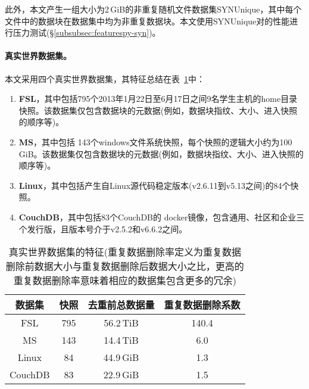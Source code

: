 此外，本文产生一组大小为2\,GiB的非重复随机文件数据集SYNUnique，其中每个文件中的数据块在数据集中均为非重复数据块。本文使用SYNUnique对\prototype 的性能进行压力测试(\S\ref{subsubsec:featurespy-syn})。

\paragraph*{真实世界数据集。}本文采用四个真实世界数据集，其特征总结在表~\ref{tab:featurespy-datasets}中： 

\begin{enumerate}
    \item \textbf{FSL}\cite{fsl}，其中包括795个2013年1月22日至6月17日之间9名学生主机的home目录快照。该数据集仅包含数据块的元数据(例如，数据块指纹、大小、进入快照的顺序等)。
    \item \textbf{MS}\cite{meyer2011deduplication}，其中包括 143个windows文件系统快照，每个快照的逻辑大小约为100\,GiB。该数据集仅包含数据块的元数据(例如，数据块指纹、大小、进入快照的顺序等)。
    \item \textbf{Linux}\cite{linux}，其中包括产生自Linux源代码稳定版本(v2.6.11到v5.13之间)的84个快照。
    \item \textbf{CouchDB}\cite{couchdb}，其中包括83个CouchDB的 docker镜像，包含通用、社区和企业三个发行版，且版本号介于v2.5.2和v6.6.2之间。
\end{enumerate}

\begin{table}
  \centering
  \small
  \begin{tabular}{cccc}
    \toprule
    {\bf 数据集} & {\bf 快照} & {\bf 去重前总数据量} & {\bf 重复数据删除系数} \\
    \midrule
    FSL & 795 & 56.2\,TiB & 140.4 \\
    MS & 143 & 14.4\,TiB & 6.0 \\
    Linux & 84 & 44.9\,GiB & 1.3 \\
    CouchDB & 83 & 22.9\,GiB & 1.5 \\
    \bottomrule
  \end{tabular}
  \caption{真实世界数据集的特征(重复数据删除率定义为重复数据删除前数据大小与重复数据删除后数据大小之比，更高的重复数据删除率意味着相应的数据集包含更多的冗余)}
  \label{tab:featurespy-datasets}
\end{table}
